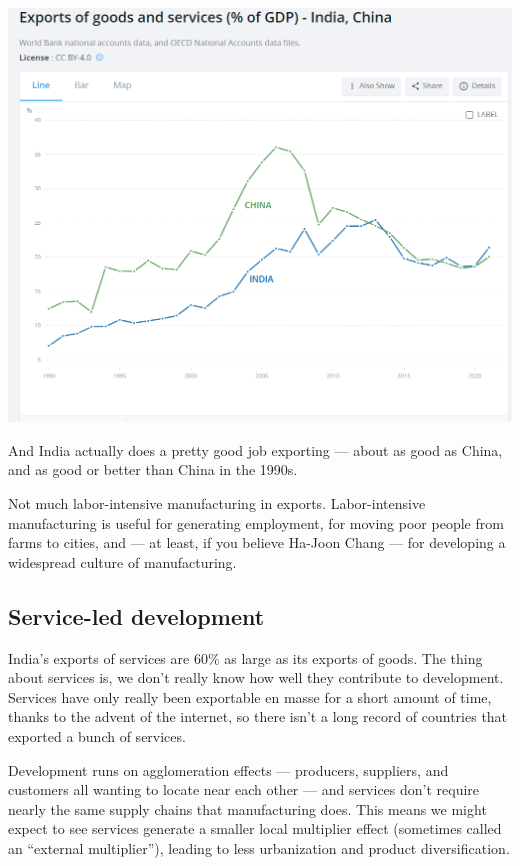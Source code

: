 \documentclass[
]{book}
\begin{document}
\includegraphics{fig/exports_india_china.png}

And India actually does a pretty good job exporting --- about as good as China, and as good or better than China in the 1990s.

Not much labor-intensive manufacturing in exports.
Labor-intensive manufacturing is useful for generating employment, for moving poor people from farms to cities, and --- at least, if you believe Ha-Joon Chang --- for developing a widespread culture of manufacturing.

\hypertarget{service-led-development}{%
\subsection{Service-led development}\label{service-led-development}}

India's exports of services are 60\% as large as its exports of goods.
The thing about services is, we don't really know how well they contribute to development.
Services have only really been exportable en masse for a short amount of time, thanks to the advent of the internet, so there isn't a long record of countries that exported a bunch of services.

Development runs on agglomeration effects --- producers, suppliers, and customers all wanting to locate near each other --- and services don't require nearly the same supply chains that manufacturing does. This means we might expect to see services generate a smaller local multiplier effect (sometimes called an ``external multiplier''), leading to less urbanization and product diversification.
\end{document}
